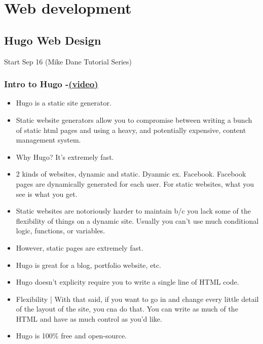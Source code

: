 \chapter{Web development}

\section{Hugo Web Design}

Start Sep 16 (Mike Dane Tutorial Series)

\subsection{Intro to Hugo -\href{https://youtu.be/qtIqKaDlqXo}{(video)} }
\begin{itemize}
	\item	Hugo is a static site generator.
	\item Static website generators allow you to compromise between writing a bunch of static html pages and using a heavy, and potentially expensive, content management system.
	\item Why Hugo? It's extremely fast.
	\item 2 kinds of websites, dynamic and static. Dyanmic ex. Facebook. Facebook pages are dynamically generated for each user. For static websites, what you see is what you get.
	\item Static websites are notoriously harder to maintain b/c you lack some of the flexibility of things  on a dynamic site. Usually you can't use much conditional logic, functions, or variables.
	\item
	However, static pages are extremely fast.
	\item
	Hugo is great for a blog, portfolio website, etc.
	\item Hugo doesn't explicity require you to write a single line of HTML code.
	\item Flexibility | With that said, if you want to go in and change every little detail of the layout of the site, you cna do that. You can write as much of the HTML and have as much control as you'd like.
	\item Hugo is 100\% free and open-source.
\end{itemize}

